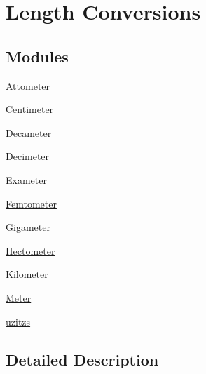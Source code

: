 \hypertarget{group___e_g_x_math-_conversions-_length_conversions}{}\section{Length Conversions}
\label{group___e_g_x_math-_conversions-_length_conversions}
\subsection*{Modules}
\begin{DoxyCompactItemize}
\item 
\mbox{\hyperlink{group___e_g_x_math-_conversions-_length_conversions-_attometer}{Attometer}}
\item 
\mbox{\hyperlink{group___e_g_x_math-_conversions-_length_conversions-_centimeter}{Centimeter}}
\item 
\mbox{\hyperlink{group___e_g_x_math-_conversions-_length_conversions-_decameter}{Decameter}}
\item 
\mbox{\hyperlink{group___e_g_x_math-_conversions-_length_conversions-_decimeter}{Decimeter}}
\item 
\mbox{\hyperlink{group___e_g_x_math-_conversions-_length_conversions-_exameter}{Exameter}}
\item 
\mbox{\hyperlink{group___e_g_x_math-_conversions-_length_conversions-_femtometer}{Femtometer}}
\item 
\mbox{\hyperlink{group___e_g_x_math-_conversions-_length_conversions-_gigameter}{Gigameter}}
\item 
\mbox{\hyperlink{group___e_g_x_math-_conversions-_length_conversions-_hectometer}{Hectometer}}
\item 
\mbox{\hyperlink{group___e_g_x_math-_conversions-_length_conversions-_kilometer}{Kilometer}}
\item 
\mbox{\hyperlink{group___e_g_x_math-_conversions-_length_conversions-_meter}{Meter}}
\item 
\mbox{\hyperlink{group___e_g_x_math-_conversions-_length_conversions-uzitzs}{uzitzs}}
\end{DoxyCompactItemize}


\subsection{Detailed Description}
